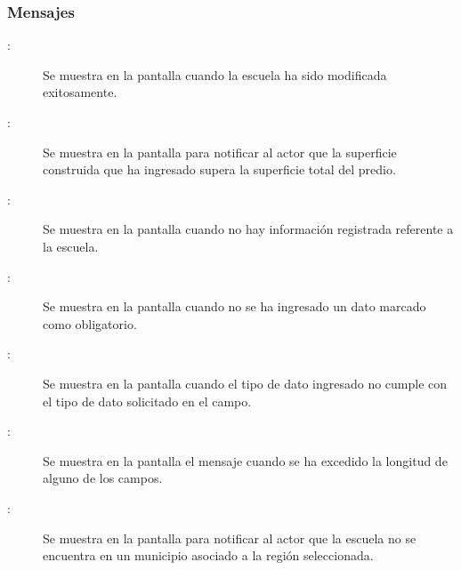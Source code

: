 \subsubsection{Mensajes} 

    \begin{description}
      \item[:] Se muestra en la pantalla  cuando la escuela ha sido modificada exitosamente.
	\item [:] Se muestra en la pantalla  para notificar al actor que la superficie construida que ha ingresado supera la superficie total del predio.
      \item[:] Se muestra en la pantalla  cuando no hay información registrada referente a la escuela.
      \item[:] Se muestra en la pantalla  cuando no se ha ingresado un dato marcado como obligatorio.
      \item[:] Se muestra en la pantalla  cuando el tipo de dato ingresado no cumple con el tipo de dato solicitado en el campo.
      \item[:] Se muestra en la pantalla el mensaje  cuando se ha excedido la longitud de alguno de los campos.
      \item[:] Se muestra  en la pantalla  para notificar al actor que la escuela no se encuentra en un municipio asociado a la región seleccionada.

    \end{description}
